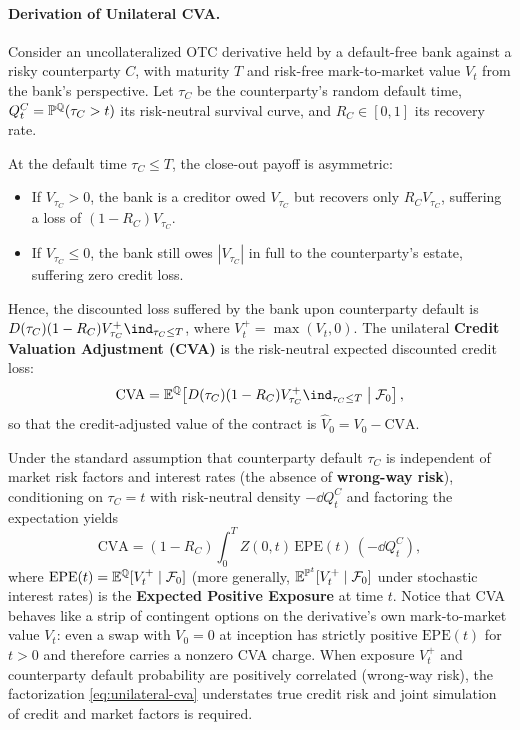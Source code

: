 \paragraph{Derivation of Unilateral CVA.}
Consider an uncollateralized OTC derivative held by a default-free bank against a risky counterparty $C$, with maturity $T$ and risk-free mark-to-market value $V_t$ from the bank's perspective. Let $\tau_C$ be the counterparty's random default time, $Q_t^C = \mathbb{P}^{\mathbb{Q}}(\tau_C > t)$ its risk-neutral survival curve, and $R_C \in [0, 1]$ its recovery rate.

At the default time $\tau_C \leq T$, the close-out payoff is asymmetric:
\begin{itemize}
    \item If $V_{\tau_C} > 0$, the bank is a creditor owed $V_{\tau_C}$ but recovers only $R_C V_{\tau_C}$, suffering a loss of $(1 - R_C) V_{\tau_C}$.
    \item If $V_{\tau_C} \leq 0$, the bank still owes $|V_{\tau_C}|$ in full to the counterparty's estate, suffering zero credit loss.
\end{itemize}
Hence, the discounted loss suffered by the bank upon counterparty default is $D(\tau_C)(1 - R_C) V_{\tau_C}^+ \ind_{\tau_C \leq T}$, where $V_t^+ = \max(V_t, 0)$. The unilateral \textbf{Credit Valuation Adjustment (CVA)} is the risk-neutral expected discounted credit loss:
\[
\mathrm{CVA} = \E^{\Q}\!\left[D(\tau_C)(1 - R_C) V_{\tau_C}^+ \ind_{\tau_C \leq T} \;\middle|\; \F_0\right],
\]
so that the credit-adjusted value of the contract is $\widehat{V}_0 = V_0 - \mathrm{CVA}$.

Under the standard assumption that counterparty default $\tau_C$ is independent of market risk factors and interest rates (the absence of \textbf{wrong-way risk}), conditioning on $\tau_C = t$ with risk-neutral density $-\dd Q_t^C$ and factoring the expectation yields
\begin{equation}\label{eq:unilateral-cva}
\mathrm{CVA} = (1 - R_C)\int_0^T Z(0, t)\,\mathrm{EPE}(t)\,(-\dd Q_t^C),
\end{equation}
where $\mathrm{EPE}(t) = \mathbb{E}^{\mathbb{Q}}[V_t^+ \mid \mathcal{F}_0]$ (more generally, $\mathbb{E}^{\mathbb{P}^t}[V_t^+ \mid \mathcal{F}_0]$ under stochastic interest rates) is the \textbf{Expected Positive Exposure} at time $t$. Notice that CVA behaves like a strip of contingent options on the derivative's own mark-to-market value $V_t$: even a swap with $V_0 = 0$ at inception has strictly positive $\mathrm{EPE}(t)$ for $t > 0$ and therefore carries a nonzero CVA charge. When exposure $V_t^+$ and counterparty default probability are positively correlated (wrong-way risk), the factorization \eqref{eq:unilateral-cva} understates true credit risk and joint simulation of credit and market factors is required.

